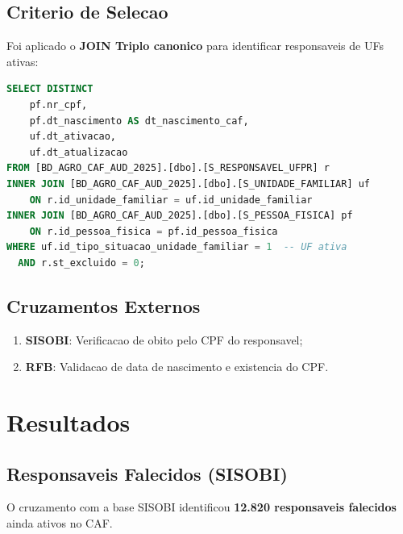 \documentclass[11pt,a4paper]{article}
\begin{document}
\subsection{Criterio de Selecao}

Foi aplicado o \textbf{JOIN Triplo canonico} para identificar responsaveis de UFs ativas:

\begin{lstlisting}[language=SQL, caption={Selecao de responsaveis ativos}]
SELECT DISTINCT
    pf.nr_cpf,
    pf.dt_nascimento AS dt_nascimento_caf,
    uf.dt_ativacao,
    uf.dt_atualizacao
FROM [BD_AGRO_CAF_AUD_2025].[dbo].[S_RESPONSAVEL_UFPR] r
INNER JOIN [BD_AGRO_CAF_AUD_2025].[dbo].[S_UNIDADE_FAMILIAR] uf
    ON r.id_unidade_familiar = uf.id_unidade_familiar
INNER JOIN [BD_AGRO_CAF_AUD_2025].[dbo].[S_PESSOA_FISICA] pf
    ON r.id_pessoa_fisica = pf.id_pessoa_fisica
WHERE uf.id_tipo_situacao_unidade_familiar = 1  -- UF ativa
  AND r.st_excluido = 0;
\end{lstlisting}

\subsection{Cruzamentos Externos}

\begin{enumerate}
    \item \textbf{SISOBI}: Verificacao de obito pelo CPF do responsavel;
    \item \textbf{RFB}: Validacao de data de nascimento e existencia do CPF.
\end{enumerate}

\section{Resultados}

\subsection{Responsaveis Falecidos (SISOBI)}

O cruzamento com a base SISOBI identificou \textbf{12.820 responsaveis falecidos}
ainda ativos no CAF.
\end{document}
